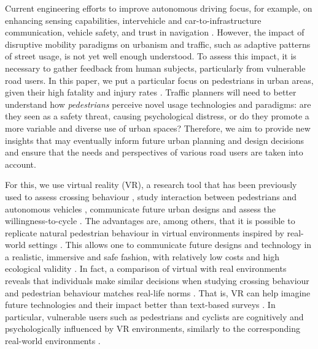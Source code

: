 Current engineering efforts to improve autonomous driving focus, for example, on enhancing sensing capabilities, intervehicle and car-to-infrastructure communication, vehicle safety, and trust in navigation \cite{Rosique2019, Gold2015, Jayaraman2019}. However, the impact of disruptive mobility paradigms on urbanism and traffic, such as adaptive patterns of street usage, is not yet well enough understood. To assess this impact, it is necessary to gather feedback from human subjects, particularly from vulnerable road users. In this paper, we put a particular focus on pedestrians in urban areas, given their high fatality and injury rates \cite{EuropeanCommission2021, HighwayTrafficSafetyAdministration2023}. Traffic planners will need to better understand how \emph{pedestrians} perceive novel usage technologies and paradigms: are they seen as a safety threat, causing psychological distress, or do they promote a more variable and diverse use of urban spaces? Therefore, we aim to provide new insights that may eventually inform future urban planning and design decisions and ensure that the needs and perspectives of various road users are taken into account.

For this, we use virtual reality (VR), a research tool that has been previously used to assess crossing behaviour \cite{SobhaniTransResF2019}, study interaction between pedestrians and autonomous vehicles \cite{Nazemi2021}, communicate future urban designs \cite{DrettakisPresence2007} and assess the willingness-to-cycle \cite{Nazemi2021}. The advantages are, among others, that it is possible to replicate natural pedestrian behaviour in virtual environments inspired by real-world settings \cite{Angulo2023}. This allows one to communicate future designs and technology in a realistic, immersive and safe fashion, with relatively low costs and high ecological validity \cite{Oselinsky2023}. In fact, a comparison of virtual with real environments reveals that individuals make similar decisions when studying crossing behaviour \cite{Bhagavathula2008} and pedestrian behaviour matches real-life norms \cite{DebAppliedErgonomics2017}. That is, VR can help imagine future technologies and their impact better than text-based surveys \cite{FarooqEtAlTRR_2018}. In particular, vulnerable users such as pedestrians and cyclists are cognitively and psychologically influenced by VR environments, similarly to the corresponding real-world environments \cite{Guo2022}.

